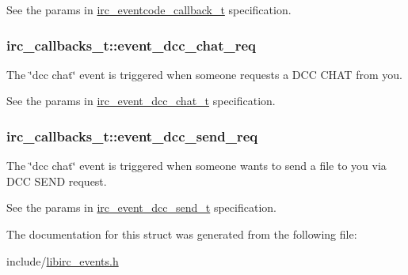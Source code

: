 See the params in \hyperlink{libirc__events_8h_b6000d309e87cfb727dcad0136fcb79f}{irc\_\-eventcode\_\-callback\_\-t} specification. \hypertarget{structirc__callbacks__t_fbaf019778a64b544093ee29da5b3c81}{
\subsubsection[event\_\-dcc\_\-chat\_\-req]{ {\bf irc\_\-callbacks\_\-t::event\_\-dcc\_\-chat\_\-req}}}
\label{structirc__callbacks__t_fbaf019778a64b544093ee29da5b3c81}


The \char`\"{}dcc chat\char`\"{} event is triggered when someone requests a DCC CHAT from you.

See the params in \hyperlink{libirc__events_8h_8c3ddaa55e5ded002b5054f0b926381c}{irc\_\-event\_\-dcc\_\-chat\_\-t} specification. \hypertarget{structirc__callbacks__t_2ac9d08921faee2472ed16d41799887d}{
\subsubsection[event\_\-dcc\_\-send\_\-req]{ {\bf irc\_\-callbacks\_\-t::event\_\-dcc\_\-send\_\-req}}}
\label{structirc__callbacks__t_2ac9d08921faee2472ed16d41799887d}


The \char`\"{}dcc chat\char`\"{} event is triggered when someone wants to send a file to you via DCC SEND request.

See the params in \hyperlink{libirc__events_8h_5f4b1d95f2d6619041f993ba748544cf}{irc\_\-event\_\-dcc\_\-send\_\-t} specification. 

The documentation for this struct was generated from the following file:\begin{CompactItemize}
\item 
include/\hyperlink{libirc__events_8h}{libirc\_\-events.h}\end{CompactItemize}
